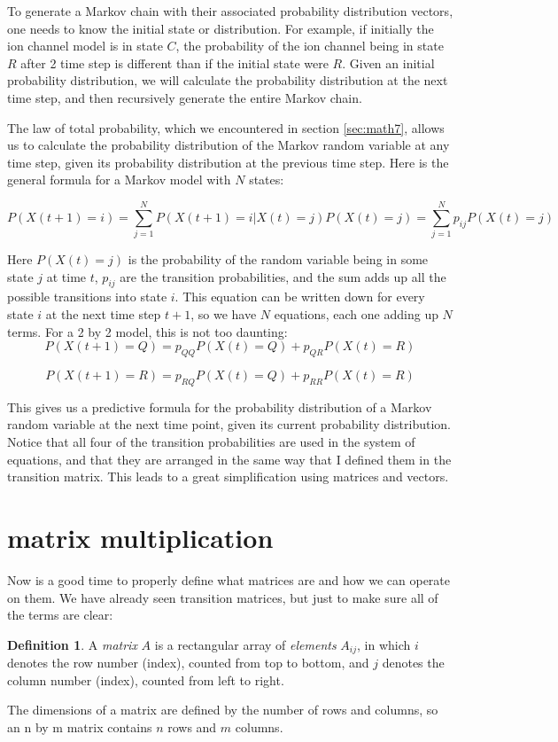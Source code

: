 \documentclass[
]{book}
\theoremstyle{definition}
\newtheorem{definition}{Definition}[chapter]
\theoremstyle{definition}
\theoremstyle{definition}
\theoremstyle{remark}
\begin{document}
To generate a Markov chain with their associated probability distribution vectors, one needs to know the initial state or distribution. For example, if initially the ion channel model is in state \(C\), the probability of the ion channel being in state \(R\) after 2 time step is different than if the initial state were \(R\). Given an initial probability distribution, we will calculate the probability distribution at the next time step, and then recursively generate the entire Markov chain.

The law of total probability, which we encountered in section \ref{sec:math7}, allows us to calculate the probability distribution of the Markov random variable at any time step, given its probability distribution at the previous time step. Here is the general formula for a Markov model with \(N\) states:

\[
P(X(t+1) = i) = \sum_{j=1}^N P(X(t+1) = i | X(t) = j )P(X(t) = j) = \sum_{j=1}^N p_{ij}P(X(t) = j)
\]

Here \(P(X(t) = j)\) is the probability of the random variable being in some state \(j\) at time \(t\), \(p_{ij}\) are the transition probabilities, and the sum adds up all the possible transitions into state \(i\). This equation can be written down for every state \(i\) at the next time step \(t+1\), so we have \(N\) equations, each one adding up \(N\) terms. For a 2 by 2 model, this is not too daunting:
\[ 
P(X(t+1) = Q) = p_{QQ}P(X(t) = Q) + p_{QR}P(X(t) = R) \]

\[ 
P(X(t+1) = R) = p_{RQ}P(X(t) = Q) + p_{RR}P(X(t) = R) 
\]

This gives us a predictive formula for the probability distribution of a Markov random variable at the next time point, given its current probability distribution. Notice that all four of the transition probabilities are used in the system of equations, and that they are arranged in the same way that I defined them in the transition matrix. This leads to a great simplification using matrices and vectors.

\hypertarget{matrix-multiplication}{%
\section{matrix multiplication}\label{matrix-multiplication}}

Now is a good time to properly define what matrices are and how we can operate on them. We have already seen transition matrices, but just to make sure all of the terms are clear:
\begin{definition}
\protect\hypertarget{def:def-matrix}{}{\label{def:def-matrix} }A \emph{matrix} \(A\) is a rectangular array of \emph{elements} \(A_{ij}\), in which \(i\) denotes the row number (index), counted from top to bottom, and \(j\) denotes the column number (index), counted from left to right.

The dimensions of a matrix are defined by the number of rows and columns, so an n by m matrix contains \(n\) rows and \(m\) columns.
\end{definition}
\end{document}
